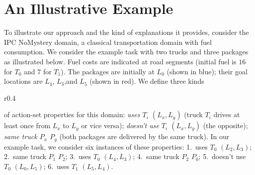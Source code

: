 
\section{An Illustrative Example}
\label{illustrative-example}



To illustrate our approach and the kind of explanations it provides,
consider the IPC NoMystery domain, a classical transportation domain
with fuel consumption. We consider the example task with two trucks
and three packages as illustrated below. Fuel costs are indicated at
road segments (initial fuel is $16$ for $T_0$ and $7$ for $T_1$). The
packages are initially at $L_0$ (shown in blue); their goal locations
are $L_4$, $L_3$,and $L_5$ (shown in red). We define three kinds %
%
\begin{wrapfigure}{r}{0.4\columnwidth}
\vspace{-0.3cm} \hspace{-0.7cm} 
\vspace{-0.3cm}
\end{wrapfigure}
%
of action-set properties for this domain:
\emph{uses $T_i$ $(L_x,L_y)$} (truck $T_i$ drives at least once from
$L_x$ to $L_y$ or vice versa); \emph{doesn't use $T_i$ $(L_x,L_y)$}
(the opposite); \emph{same truck $P_x$ $P_y$} (both packages are
delivered by the same truck). In our example task, we consider six
instances of these properties: 1.\ uses $T_0$ $(L_2,L_3)$; 2.\ same
truck $P_1$ $P_2$; 3.\ uses $T_0$ $(L_4,L_3)$; 4.\ same truck $P_2$
$P_0$; 5.\ doesn't use $T_0$ $(L_0,L_5)$; 6.\ uses $T_1$ $(L_5,L_4)$.

